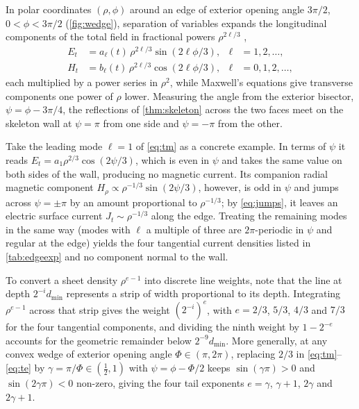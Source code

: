 In polar coordinates $(\rho,\phi)$ around an edge of exterior opening angle $3\pi/2$, $0<\phi<3\pi/2$ (\autoref{fig:wedge}), separation of variables expands the longitudinal components of the total field in fractional powers $\rho^{2\ell/3}$ \cite{meixner1972,costabel2000},
\begin{align}
  E_t &= a_\ell(t)\,\rho^{2\ell/3}\sin(2\ell\phi/3), & \ell &= 1,2,\dots, \label{eq:tm}\\
  H_t &= b_\ell(t)\,\rho^{2\ell/3}\cos(2\ell\phi/3), & \ell &= 0,1,2,\dots, \label{eq:te}
\end{align}
each multiplied by a power series in $\rho^2$, while Maxwell's equations give transverse components one power of $\rho$ lower. Measuring the angle from the exterior bisector, $\psi = \phi - 3\pi/4$, the reflections of \autoref{thm:skeleton} across the two faces meet on the skeleton wall at $\psi = \pi$ from one side and $\psi = -\pi$ from the other.

Take the leading mode $\ell = 1$ of \eqref{eq:tm} as a concrete example. In terms of $\psi$ it reads $E_t = a_1\rho^{2/3}\cos(2\psi/3)$, which is even in $\psi$ and takes the same value on both sides of the wall, producing no magnetic current. Its companion radial magnetic component $H_\rho\propto\rho^{-1/3}\sin(2\psi/3)$, however, is odd in $\psi$ and jumps across $\psi = \pm\pi$ by an amount proportional to $\rho^{-1/3}$; by \eqref{eq:jumps}, it leaves an electric surface current $J_t\sim\rho^{-1/3}$ along the edge. Treating the remaining modes in the same way (modes with $\ell$ a multiple of three are $2\pi$-periodic in $\psi$ and regular at the edge) yields the four tangential current densities listed in \autoref{tab:edgeexp} and no component normal to the wall.

To convert a sheet density $\rho^{e-1}$ into discrete line weights, note that the line at depth $2^{-i}d_{\min}$ represents a strip of width proportional to its depth. Integrating $\rho^{e-1}$ across that strip gives the weight $(2^{-i})^{e}$, with $e = 2/3$, $5/3$, $4/3$ and $7/3$ for the four tangential components, and dividing the ninth weight by $1 - 2^{-e}$ accounts for the geometric remainder below $2^{-9}d_{\min}$. More generally, at any convex wedge of exterior opening angle $\Phi\in(\pi,2\pi)$, replacing $2/3$ in \eqref{eq:tm}--\eqref{eq:te} by $\gamma = \pi/\Phi\in(\tfrac12,1)$ with $\psi = \phi - \Phi/2$ keeps $\sin(\gamma\pi) > 0$ and $\sin(2\gamma\pi) < 0$ non-zero, giving the four tail exponents $e = \gamma$, $\gamma+1$, $2\gamma$ and $2\gamma+1$.

